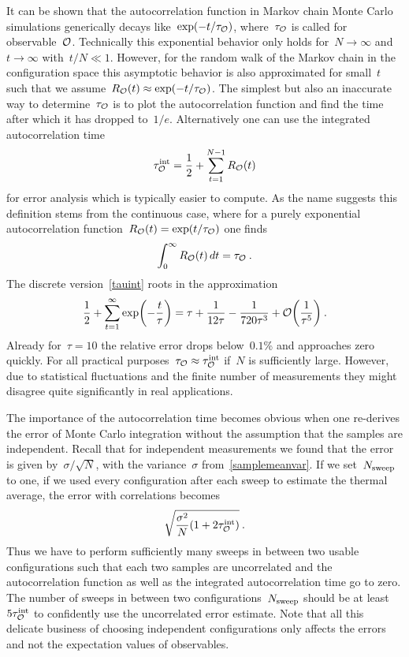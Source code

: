It can be shown that the autocorrelation function in Markov chain Monte Carlo
simulations generically decays like~$\exp(-t/\tau_{\mathcal{O}})$, where~$\tau_{\mathcal{O}}$ is
called  for observable~$\mathcal{O}$. Technically this
exponential behavior only holds for~$N \to \infty$ and~$t \to \infty$ with~$t/N
\ll 1$. However, for the random walk of the Markov chain in the configuration
space this asymptotic behavior is also approximated for small~$t$ such that we
assume~$R_{\mathcal{O}}(t) \approx \exp(-t/\tau_{\mathcal{O}})$. The simplest but also an
inaccurate way to determine~$\tau_{\mathcal{O}}$ is to plot the autocorrelation function
and find the time after which it has dropped to~$1/e$. Alternatively one can use
the integrated autocorrelation time
%
\begin{equation}\label{tauint}
  \tau^{\mathrm{int}}_{\mathcal{O}} = \frac{1}{2} + \sum_{t=1}^{N-1} R_{\mathcal{O}}(t)
\end{equation}
%
for error analysis which is typically easier to compute. As the name suggests
this definition stems from the continuous case, where for a purely exponential
autocorrelation function~$R_{\mathcal{O}}(t) = \exp(t/\tau_{\mathcal{O}})$ one finds
%
\begin{equation}
  \int_0^{\infty} R_{\mathcal{O}}(t) \,dt = \tau_{\mathcal{O}}\:.
\end{equation}
%
The discrete version~\eqref{tauint} roots in the approximation
%
\begin{equation}
  \frac{1}{2} + \sum_{t=1}^{\infty} \exp \biggl( - \frac{t}{\tau} \biggr) =
    \tau + \frac{1}{12 \tau} - \frac{1}{720 \tau^3} +
    \mathcal{O}\biggl( \frac{1}{\tau^5} \biggr)\:.
\end{equation}
%
Already for~$\tau = 10$ the relative error drops below~$0.1$\% and approaches
zero quickly. For all practical purposes~$\tau_{\mathcal{O}} \approx \tau^{\mathrm{int}}_{\mathcal{O}}$
if~$N$ is sufficiently large. However, due to statistical fluctuations and the
finite number of measurements they might disagree quite significantly in real
applications.

The importance of the autocorrelation time becomes obvious when one re-derives
the error of Monte Carlo integration without the assumption that the samples are
independent. Recall that for independent measurements we found that the error is
given by~$\sigma/\sqrt{N}$, with the variance~$\sigma$
from~\eqref{samplemeanvar}. If we set~$N_{\mathrm{sweep}}$ to one, \ie{} if we used every
configuration after each sweep to estimate the thermal average, the error with
correlations becomes
%
\begin{equation}\label{correrror}
  \sqrt{\frac{\sigma^2}{N}(1 + 2\tau^{\mathrm{int}}_{\mathcal{O}})}\:.
\end{equation}
%
Thus we have to perform sufficiently many sweeps in between two usable
configurations such that each two samples are uncorrelated and the
autocorrelation function as well as the integrated autocorrelation time go to
zero. The number of sweeps in between two configurations~$N_{\mathrm{sweep}}$ should be at
least~$5 \tau^{\mathrm{int}}_{\mathcal{O}}$ to confidently use the uncorrelated error estimate. Note
that all this delicate business of choosing independent configurations only
affects the errors and not the expectation values of observables.

